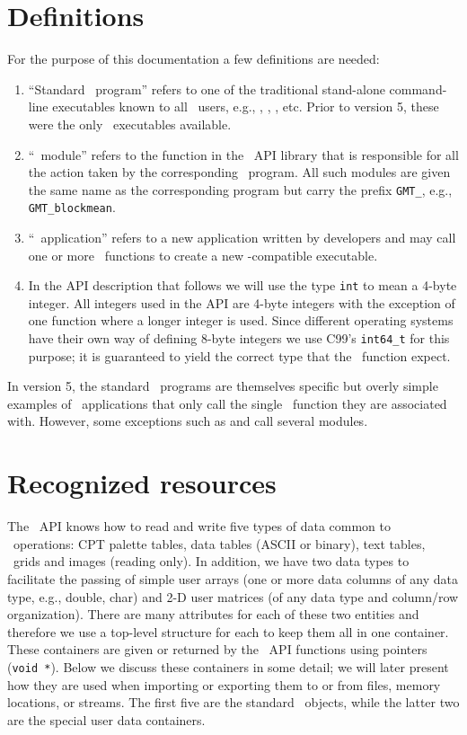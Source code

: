 \documentclass[11pt]{report}
\begin{document}
\section{Definitions}

For the purpose of this documentation a few definitions are needed:

\begin{enumerate}
\item ``Standard \GMT\ program'' refers to one of the traditional stand-alone command-line
executables known to all \GMT\ users, e.g., , ,
, etc.  Prior to version 5, these were the only \GMT\ executables available.
\item ``\GMT\ module'' refers to the function in the \GMT\ API
library that is responsible for all the action taken by the corresponding \GMT\ program.  All
such modules are given the same name as the corresponding program but carry the
prefix \texttt{GMT\_}, e.g., \texttt{GMT\_blockmean}.
\item ``\GMT\ application'' refers to a new application written by developers
and may call one or more \GMT\ functions to create a new \GMT-compatible executable.
\item In the API description that follows we will use the type \texttt{int} to mean
a 4-byte integer.  All integers used in the API are 4-byte integers with the exception
of one function where a longer integer is used.  Since different operating systems have their
own way of defining 8-byte integers we use C99's \texttt{int64\_t} for this purpose; it is guaranteed to yield
the correct type that the \GMT\ function expect.
\end{enumerate}
In version 5, the standard \GMT\ programs are themselves specific but overly simple examples
of \GMT\ applications that only call the single \GMT\ function they are associated with.
However, some exceptions such as  and  call several modules.

\section{Recognized resources}

The \GMT\ API knows how to read and write five types of data common to \GMT\ operations:
CPT palette tables, data tables (ASCII or binary), text tables, \GMT\ grids and images (reading only).
In addition, we have two data types to facilitate the passing of simple user arrays (one or more data columns
of any data type, e.g., double, char) and 2-D user matrices (of any data type and column/row organization).
There are many attributes for each of these two entities and therefore we use a top-level structure for each
to keep them all in one container.  These containers are given or returned by the \GMT\ API
functions using pointers (\texttt{void *}).  Below we discuss these containers in some detail; we
will later present how they are used when importing or exporting them to or from files,
memory locations, or streams.  The first five are the standard \GMT\ objects, while the latter two are the
special user data containers.
\end{document}
